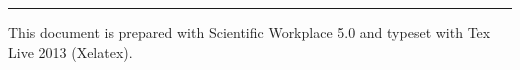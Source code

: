 \documentclass[12pt,a4paper]{article}
\begin{document}
\bigskip

\null
\vfill

\begin{center}
\rule{6in}{0.01in}
\end{center}

\noindent This document is prepared with Scientific Workplace 5.0 and
typeset with Tex Live 2013 (Xelatex).

\noindent\href{http://whymranderson.blogspot.tw/2014/03/how-to-convert-swp-50-special-unicode.html%
}{\underline{\color{blue}}}

\noindent\href{https://drive.google.com/file/d/0B96HmLH-SQVmM1dvYlFiQm9ESGM/edit?usp=sharing%
}{\underline{\color{blue}%
%
}}

\bigskip

%
\end{document}
